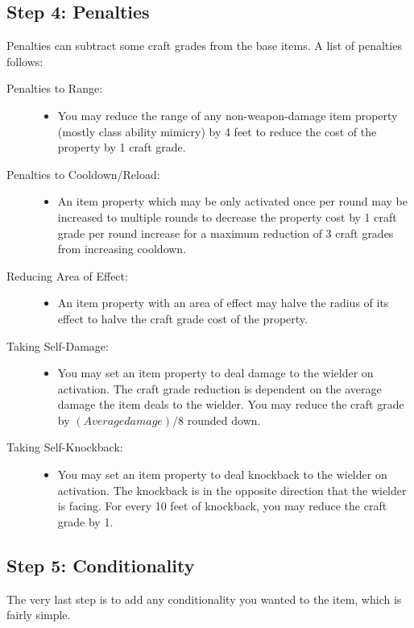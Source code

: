 \subsection{Step 4: Penalties}
Penalties can subtract some craft grades from the base items. A list of penalties follows:
\begin{description}
	\item[Penalties to Range:] \hfill
	\begin{itemize}
		\item You may reduce the range of any non-weapon-damage item property (mostly class ability mimicry) by 4 feet to reduce the cost of the property by 1 craft grade.
	\end{itemize}
	\item[Penalties to Cooldown/Reload:] \hfill
	\begin{itemize}
		\item An item property which may be only activated once per round may be increased to multiple rounds to decrease the property cost by 1 craft grade per round increase for a maximum reduction of 3 craft grades from increasing cooldown.
	\end{itemize}
	\item[Reducing Area of Effect:] \hfill
	\begin{itemize}
		\item An item property with an area of effect may halve the radius of its effect to halve the craft grade cost of the property.
	\end{itemize}
	\item[Taking Self-Damage:] \hfill
	\begin{itemize}
		\item You may set an item property to deal damage to the wielder on activation. The craft grade reduction is dependent on the average damage the item deals to the wielder. You may reduce the craft grade by $(Averagedamage)/8$ rounded down.
	\end{itemize}
	\item[Taking Self-Knockback:] \hfill
	\begin{itemize}
		\item You may set an item property to deal knockback to the wielder on activation. The knockback is in the opposite direction that the wielder is facing. For every 10 feet of knockback, you may reduce the craft grade by 1.
	\end{itemize}
\end{description}

\subsection{Step 5: Conditionality}
The very last step is to add any conditionality you wanted to the item, which is fairly simple.

